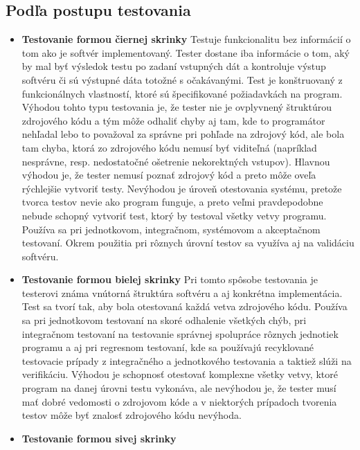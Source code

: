 \documentclass[11pt,twoside,slovak,a4paper]{article}
\begin{document}
	\subsection{Podľa postupu testovania}
	\begin{itemize}
		\item \textbf{Testovanie formou čiernej skrinky} \newline
			Testuje funkcionalitu bez informácií o tom ako je softvér implementovaný. Tester dostane iba informácie o tom, aký by mal byť výsledok testu po zadaní vstupných dát a kontroluje výstup softvéru či sú výstupné dáta totožné s očakávanými\cite{EST2002}. Test je konštruovaný z funkcionálnych vlastností, ktoré sú špecifikované požiadavkách na program\cite{Moha1991}.  Výhodou tohto typu testovania je, že tester nie je ovplyvnený štruktúrou zdrojového kódu a tým môže odhaliť chyby aj tam, kde to programátor nehľadal lebo to považoval za správne pri pohľade na zdrojový kód, ale bola tam chyba, ktorá zo zdrojového kódu nemusí byť viditeľná (napríklad nesprávne, resp. nedostatočné ošetrenie nekorektných vstupov). Hlavnou výhodou je, že tester nemusí poznať zdrojový kód a preto môže oveľa rýchlejšie vytvoriť testy. Nevýhodou je úroveň otestovania systému, pretože tvorca testov nevie ako program funguje, a preto veľmi pravdepodobne nebude schopný vytvoriť test, ktorý by testoval všetky vetvy programu. Používa sa pri jednotkovom, integračnom, systémovom a akceptačnom testovaní. Okrem použitia pri rôznych úrovní testov sa využíva aj na validáciu softvéru\cite{EST2002}.
		\item \textbf{Testovanie formou bielej skrinky} \newline
			Pri tomto spôsobe testovania je testerovi známa vnútorná štruktúra softvéru a aj konkrétna implementácia. Test sa tvorí tak, aby bola otestovaná každá vetva zdrojového kódu\cite{EST2002}. Používa sa pri jednotkovom testovaní na skoré odhalenie všetkých chýb, pri integračnom testovaní na testovanie správnej spolupráce rôznych jednotiek programu a aj pri regresnom testovaní, kde sa používajú recyklované testovacie prípady z integračného a jednotkového testovania a taktiež slúži na verifikáciu. Výhodou je schopnosť otestovať komplexne všetky vetvy, ktoré program na danej úrovni testu vykonáva, ale nevýhodou je, že tester musí mať dobré vedomosti o zdrojovom kóde a v niektorých prípadoch tvorenia testov môže byť znalosť zdrojového kódu nevýhoda.
		\item \textbf{Testovanie formou sivej skrinky} \newline

\end{itemize}
\end{document}
